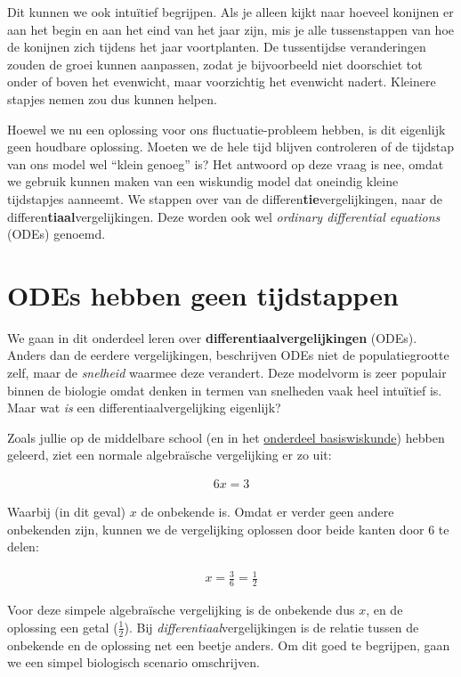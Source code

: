 \documentclass[
  a4paper,
]{scrbook}
\theoremstyle{definition}
\theoremstyle{remark}
\begin{document}
Dit kunnen we ook intuïtief begrijpen. Als je alleen kijkt naar hoeveel
konijnen er aan het begin en aan het eind van het jaar zijn, mis je alle
tussenstappen van hoe de konijnen zich tijdens het jaar voortplanten. De
tussentijdse veranderingen zouden de groei kunnen aanpassen, zodat je
bijvoorbeeld niet doorschiet tot onder of boven het evenwicht, maar
voorzichtig het evenwicht nadert. Kleinere stapjes nemen zou dus kunnen
helpen.

Hoewel we nu een oplossing voor ons fluctuatie-probleem hebben, is dit
eigenlijk geen houdbare oplossing. Moeten we de hele tijd blijven
controleren of de tijdstap van ons model wel ``klein genoeg'' is? Het
antwoord op deze vraag is nee, omdat we gebruik kunnen maken van een
wiskundig model dat oneindig kleine tijdstapjes aanneemt. We stappen
over van de differen\textbf{tie}vergelijkingen, naar de
differen\textbf{tiaal}vergelijkingen. Deze worden ook wel \emph{ordinary
differential equations} (ODEs) genoemd.

\section{ODEs hebben geen
tijdstappen}\label{odes-hebben-geen-tijdstappen}

We gaan in dit onderdeel leren over \textbf{differentiaalvergelijkingen}
(ODEs). Anders dan de eerdere vergelijkingen, beschrijven ODEs niet de
populatiegrootte zelf, maar de \emph{snelheid} waarmee deze verandert.
Deze modelvorm is zeer populair binnen de biologie omdat denken in
termen van snelheden vaak heel intuïtief is. Maar wat \emph{is} een
differentiaalvergelijking eigenlijk?

Zoals jullie op de middelbare school (en in het
\href{@sec-algebra}{onderdeel basiswiskunde}) hebben geleerd, ziet een
normale algebraïsche vergelijking er zo uit:

\begin{align}
    6x=3
\end{align}

Waarbij (in dit geval) \(x\) de onbekende is. Omdat er verder geen
andere onbekenden zijn, kunnen we de vergelijking oplossen door beide
kanten door \(6\) te delen:

\begin{align}
    x=\frac{3}{6}=\frac{1}{2}
\end{align}

Voor deze simpele algebraïsche vergelijking is de onbekende dus \(x\),
en de oplossing een getal (\(\frac{1}{2}\)). Bij
\emph{differentiaal}vergelijkingen is de relatie tussen de onbekende en
de oplossing net een beetje anders. Om dit goed te begrijpen, gaan we
een simpel biologisch scenario omschrijven.
\end{document}
